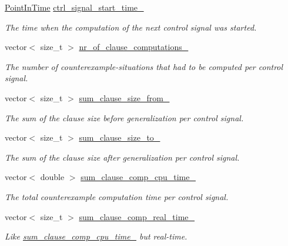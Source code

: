\begin{DoxyCompactItemize}
\hyperlink{Options_8h_af3a9f634f27bed7e98dbc23e5c6f807d}{Point\-In\-Time} \hyperlink{classLearningExtractorStatistics_aaf7283a491c91200e03e0ca29f7bcd93}{ctrl\-\_\-signal\-\_\-start\-\_\-time\-\_\-}
\begin{DoxyCompactList}\small\item\em The time when the computation of the next control signal was started. \end{DoxyCompactList}\item 
vector$<$ size\-\_\-t $>$ \hyperlink{classLearningExtractorStatistics_a20b2771dd74bd0e2e08d7568149bef14}{nr\-\_\-of\-\_\-clause\-\_\-computations\-\_\-}
\begin{DoxyCompactList}\small\item\em The number of counterexample-\/situations that had to be computed per control signal. \end{DoxyCompactList}\item 
vector$<$ size\-\_\-t $>$ \hyperlink{classLearningExtractorStatistics_a2a7ac5da4b46b9366430f6934579ade7}{sum\-\_\-clause\-\_\-size\-\_\-from\-\_\-}
\begin{DoxyCompactList}\small\item\em The sum of the clause size before generalization per control signal. \end{DoxyCompactList}\item 
vector$<$ size\-\_\-t $>$ \hyperlink{classLearningExtractorStatistics_ac503db6146780edd0fd6316777d251cf}{sum\-\_\-clause\-\_\-size\-\_\-to\-\_\-}
\begin{DoxyCompactList}\small\item\em The sum of the clause size after generalization per control signal. \end{DoxyCompactList}\item 
vector$<$ double $>$ \hyperlink{classLearningExtractorStatistics_a3e3c198d4480eb0b74410126bc2040e9}{sum\-\_\-clause\-\_\-comp\-\_\-cpu\-\_\-time\-\_\-}
\begin{DoxyCompactList}\small\item\em The total counterexample computation time per control signal. \end{DoxyCompactList}\item 
vector$<$ size\-\_\-t $>$ \hyperlink{classLearningExtractorStatistics_a505c22ba13094231793f0d5aeaf362f6}{sum\-\_\-clause\-\_\-comp\-\_\-real\-\_\-time\-\_\-}
\begin{DoxyCompactList}\small\item\em Like \hyperlink{classLearningExtractorStatistics_a3e3c198d4480eb0b74410126bc2040e9}{sum\-\_\-clause\-\_\-comp\-\_\-cpu\-\_\-time\-\_\-} but real-\/time. \end{DoxyCompactList}\item 

\end{DoxyCompactItemize}

